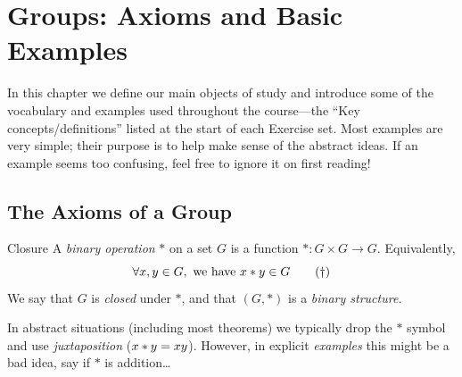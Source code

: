 \graphicspath{{2groups/asy/}}

\section{Groups: Axioms and Basic Examples}\label{chap:groups}

In this chapter we define our main objects of study and introduce some of the vocabulary and examples used throughout the course---the ``Key concepts/definitions'' listed at the start of each Exercise set. Most examples are very simple; their purpose is to help make sense of the abstract ideas. If an example seems too confusing, feel free to ignore it on first reading! 


\subsection{The Axioms of a Group}\label{sec:groupaxioms}

\begin{defn}{Closure}{}
A \emph{binary operation} $*$ on a set $G$ is a function $*:G\times G\to G$. Equivalently,
\[
	\forall x,y\in G,\text{ we have }x\mathbin{\ast} y\in G\tag{$\dag$}
\]
We say that $G$ is \emph{closed} under $*$, and that $(G,*)$ is a \emph{binary structure.}
\end{defn}


In abstract situations (including most theorems) we typically drop the $\ast$ symbol and use \emph{juxtaposition} ($x\mathbin{\ast} y=xy$). However, in explicit \emph{examples} this might be a bad idea, say if $*$ is addition\ldots

